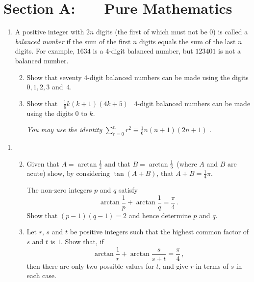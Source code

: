 \documentclass[a4, 11pt]{report}
\newlength{\qspace}
\newcounter{qnumber}
\newenvironment{question}%
 {\vspace{\qspace}
  \begin{enumerate}[\bfseries 1\quad][10]%
    \setcounter{enumi}{\value{qnumber}}%
    \item%
 }
{
  \end{enumerate}
  \filbreak
  \stepcounter{qnumber}
 }
\newenvironment{questionparts}[1][1]%
 {
  \begin{enumerate}[\bfseries (i)]%
    \setcounter{enumii}{#1}
    \addtocounter{enumii}{-1}
    \setlength{\itemsep}{5mm}
    \setlength{\parskip}{8pt}
 }
 {
  \end{enumerate}
 }
\newcommand{\ds}{\displaystyle}
\begin{document}
\setcounter{page}{2}

 
\section*{Section A: \ \ \ Pure Mathematics}

\begin{question}
A positive integer with $2n$ digits (the first of which must not be $0$) is
called a {\sl balanced number} if the sum of the first
$n$ digits equals the sum of the last $n$ digits.
For example,
$1634$ is a  $4$-digit balanced number,
but $123401$ is not a balanced number.

\begin{questionparts}
\item
Show that seventy $4$-digit balanced numbers can 
be made using the digits $0, 1, 2, 3$ and~$4$.

\item
Show that 
\  $\frac16 {k \left( k+1 \right) \left( 4k+5 \right) }$  
\ $4$-digit balanced numbers can be made using the digits $0$ to $k$.


{\it You may use the identity 
$\ds \sum _{r=0}^{n} r^2 \equiv \tfrac{1}{6} {n \left( n+1 \right) 
\left( 2n+1 \right) } \;$.}

\end{questionparts}
\end{question}

\begin{question}
\begin{questionparts}
\item Given that $A = \arctan \frac12$
and that $B = \arctan\frac13\,$ (where $A$ and $B$
are acute) show, by considering $\tan \left( A + B \right)$, 
that $A + B = {\frac{1}{4}\pi  }$.


The non-zero integers $p$ and $q$ satisfy
\[
\displaystyle \arctan {\frac1 p} + \arctan {\frac1  q}
= {\frac\pi 4}\,.
\] 
Show that \mbox{$ \left ( p-1 \right) \left(q-1 \right) = 2$} and 
hence determine $p$ and $q$.



\item Let $r$, $s$ and $t$ be positive integers
such that  the highest common factor of $s$ and $t$ is $1$. Show that, if
\[
\arctan {\frac1  r} + \arctan \frac s {s+t} = {\frac\pi  4}\,,
\]
then there are only two possible values for $t$, and give $r$ in terms of $s$ in each case.

\end{questionparts}
\end{question}
\end{document}
